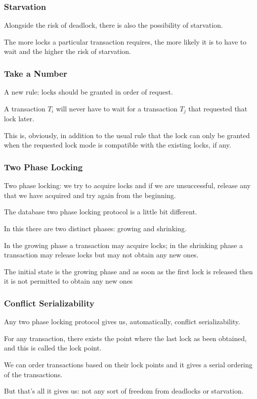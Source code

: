 \begin{frame}
\frametitle{Starvation}

Alongside the risk of deadlock, there is also the possibility of starvation. 

The more locks a particular transaction requires, the more likely it is to have to wait and the higher the risk of starvation.

\end{frame}

\begin{frame}
\frametitle{Take a Number}

A new rule: locks should be granted in order of request.

A transaction $T_{i}$ will never have to wait for a transaction $T_{j}$ that requested that lock later. 

This is, obviously, in addition to the usual rule that the lock can only be granted when the requested lock mode is compatible with the existing locks, if any. 

\end{frame}

\begin{frame}
\frametitle{Two Phase Locking}

Two phase locking: we try to acquire locks and if we are unsuccessful, release any that we have acquired and try again from the beginning. 

The database two phase locking protocol is a little bit different. 

In this there are two distinct phases: growing and shrinking. 

In the growing phase a transaction may acquire locks; in the shrinking phase a transaction may release locks but may not obtain any new ones. 

The initial state is the growing phase and as soon as the first lock is released then it is not permitted to obtain any new ones

\end{frame}

\begin{frame}
\frametitle{Conflict Serializability}
Any two phase locking protocol gives us, automatically, conflict serializability. 

For any transaction, there exists the point where the last lock as been obtained, and this is called the \alert{lock point}. 

We can order transactions based on their lock points and it gives a serial ordering of the transactions. 

But that's all it gives us: not any sort of freedom from deadlocks or starvation.


\end{frame}

